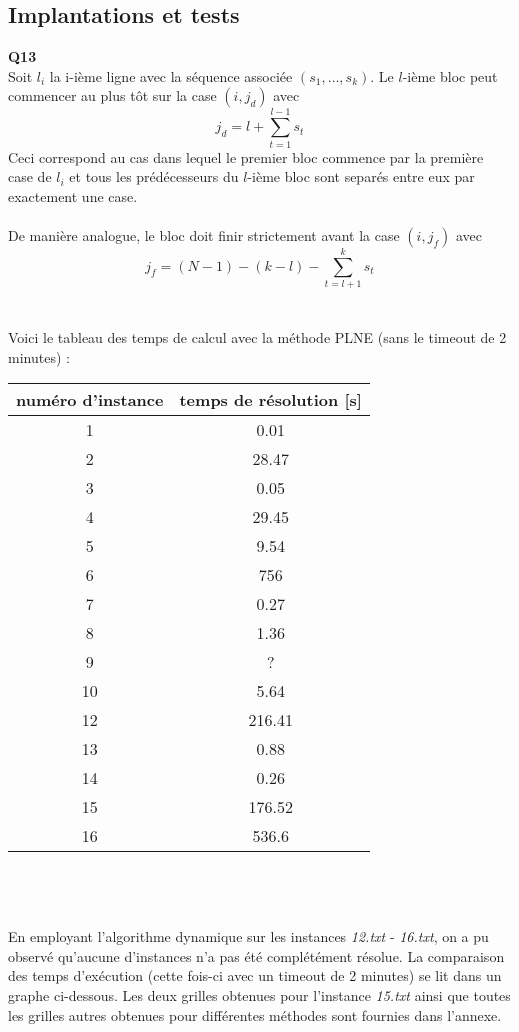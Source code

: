 \documentclass[10pt,a4paper]{article}
\begin{document}
\subsection{Implantations et tests}
\noindent
\textbf{Q13} \\ 
\noindent
Soit $l_i$ la i-ième ligne avec la séquence associée $(s_1, \hdots, s_k)$. Le $l$-ième bloc peut commencer au plus tôt sur la case $(i,j_d)$ avec $$j_d = l + \sum_{t = 1}^ {l-1} s_t$$
Ceci correspond au cas dans lequel le premier bloc commence par la première case de $l_i$ et tous les prédécesseurs du $l$-ième bloc sont separés entre eux par exactement une case. \\ \\
\noindent
De manière analogue, le bloc doit finir strictement avant la case $(i, j_f)$ avec 
$$ j_f = (N-1) - (k-l) - \sum_{t = l+1}^k s_t$$
\\ \\
\noindent
Voici le tableau des temps de calcul avec la méthode PLNE (sans le timeout de 2 minutes) : \\
\begin{tabular}{|c|c|}
\hline
numéro d'instance & temps de résolution [s]\\
\hline
\hline
1  & 0.01\\
\hline
2 & 28.47\\
\hline
3 & 0.05\\
\hline
4 & 29.45\\
\hline
5 & 9.54\\
\hline
6 & 756\\
\hline
7 & 0.27\\
\hline
8 & 1.36\\
\hline
9 & ?\\
\hline
10 & 5.64\\
\hline
12 & 216.41\\
\hline
13 & 0.88\\
\hline
14 & 0.26\\
\hline
15 & 176.52\\
\hline
16 & 536.6\\ 
\hline

\end{tabular} 
\\ \\  \\
\noindent
En employant l'algorithme dynamique sur les instances \textit{12.txt} - \textit{16.txt}, on a pu observé qu'aucune d'instances n'a pas été complétément résolue. La comparaison des temps d'exécution (cette fois-ci avec un timeout de 2 minutes) se lit dans un graphe ci-dessous. Les deux grilles obtenues pour l'instance \textit{15.txt} ainsi que toutes les grilles autres obtenues pour différentes méthodes sont fournies dans l'annexe.
\end{document}
